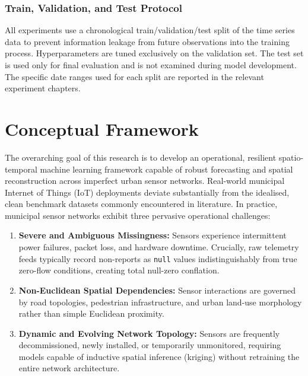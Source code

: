 \subsubsection{Train, Validation, and Test Protocol}

All experiments use a chronological train/validation/test split of the time series data to prevent information leakage from future observations into the training process. Hyperparameters are tuned exclusively on the validation set. The test set is used only for final evaluation and is not examined during model development. The specific date ranges used for each split are reported in the relevant experiment chapters.


\section{Conceptual Framework}
\label{sec:meth-framework}

The overarching goal of this research is to develop an operational, resilient spatio-temporal machine learning framework capable of robust forecasting and spatial reconstruction across imperfect urban sensor networks. Real-world municipal Internet of Things (IoT) deployments deviate substantially from the idealised, clean benchmark datasets commonly encountered in literature. In practice, municipal sensor networks exhibit three pervasive operational challenges:

\begin{enumerate}
    \item \textbf{Severe and Ambiguous Missingness:} Sensors experience intermittent power failures, packet loss, and hardware downtime. Crucially, raw telemetry feeds typically record non-reports as \texttt{null} values indistinguishably from true zero-flow conditions, creating total null-zero conflation.
    \item \textbf{Non-Euclidean Spatial Dependencies:} Sensor interactions are governed by road topologies, pedestrian infrastructure, and urban land-use morphology rather than simple Euclidean proximity.
    \item \textbf{Dynamic and Evolving Network Topology:} Sensors are frequently decommissioned, newly installed, or temporarily unmonitored, requiring models capable of inductive spatial inference (kriging) without retraining the entire network architecture.
\end{enumerate}

